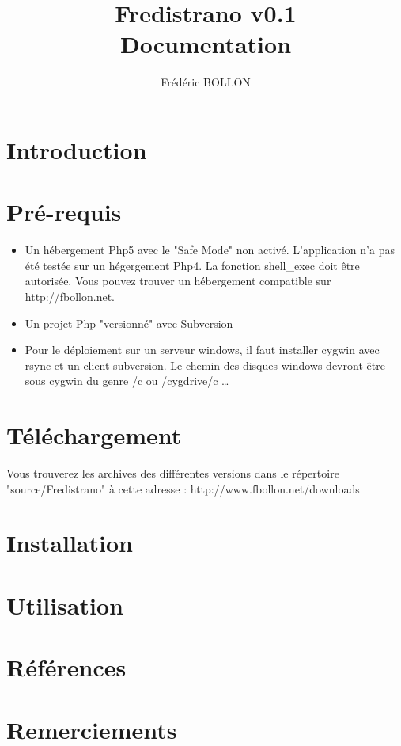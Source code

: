 \documentclass[12pt,a4paper]{report}
\author{Frédéric BOLLON}
\title{\textbf{Fredistrano v0.1}\\Documentation}
\begin{document}
\maketitle
\tableofcontents
\chapter{Introduction}


\chapter{Pré-requis}
\begin{itemize}
\item 
Un hébergement Php5 avec le "Safe Mode" non activé. L'application n'a pas été testée sur un hégergement Php4. La fonction shell_exec doit être autorisée. Vous pouvez trouver un hébergement compatible sur http://fbollon.net.
\item
Un projet Php "versionné" avec Subversion
\item
Pour le déploiement sur un serveur windows, il faut installer cygwin avec rsync et un client subversion. Le chemin des disques windows devront être sous cygwin du genre /c ou /cygdrive/c
\dots
\end{itemize}




\chapter{Téléchargement}
Vous trouverez les archives des différentes versions dans le répertoire "source/Fredistrano" à cette adresse : http://www.fbollon.net/downloads

\chapter{Installation}



\chapter{Utilisation}
\chapter{Références}
\chapter{Remerciements}
\end{document}
